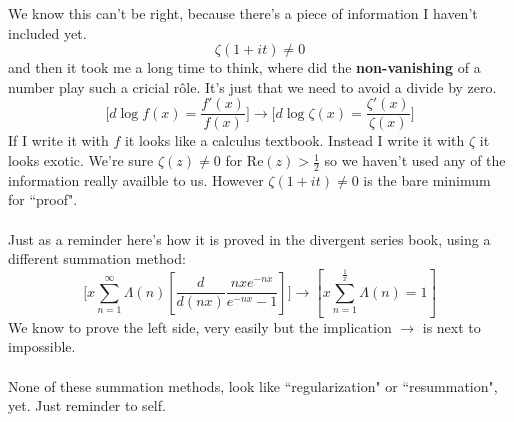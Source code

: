 \documentclass[12pt]{article}
\begin{document}
\newpage
We know this can't be right, because there's a piece of information I haven't included yet. 
$$ \zeta( 1 + it) \neq 0 $$
and then it took me a long time to think, where did the \textbf{non-vanishing} of a number play such a cricial r\^{o}le.  It's just that we need to avoid a divide by zero.
$$ \bigg[ d\log f(x) = \frac{f'(x)}{f(x)} \bigg] \to \bigg[ d \log \zeta(x) = \frac{\zeta'(x)}{\zeta(x)}\bigg]  $$
If I write it with $f$ it looks like a calculus textbook.  Instead I write it with $\zeta$ it looks exotic.  We're sure $\zeta(z) \neq 0$ for $\mathrm{Re}(z) > \frac{1}{2}$ so we haven't used any of the information really availble to us.  However  $\zeta(1 + it) \neq 0$ is the bare minimum for ``proof". \\ \\
Just as a reminder here's how it is proved in the divergent series book, using a different summation method:
$$ \Bigg[ x\sum_{n=1}^\infty \Lambda(n) \left[ \frac{d}{d(nx)} \frac{nx e^{-nx}}{e^{-nx} - 1} \right]  \Bigg] \to \left[ x \sum_{n=1}^{\frac{1}{x}} \Lambda(n) = 1 \right] $$
We know to prove the left side, very easily but the implication $\to$ is next to impossible. \\ \\
None of these summation methods, look like ``regularization" or ``resummation", yet.  Just reminder to self.
\end{document}
